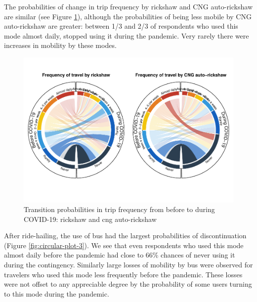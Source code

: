 \documentclass[]{elsarticle} %
\begin{document}
The probabilities of change in trip frequency by rickshaw and CNG
auto-rickshaw are similar (see Figure \ref{fig:circular-plot-2}),
although the probabilities of being less mobile by CNG auto-rickshaw are
greater: between 1/3 and 2/3 of respondents who used this mode almost
daily, stopped using it during the pandemic. Very rarely there were
increases in mobility by these modes.

\begin{figure}
\centering
\includegraphics{Frequency-of-Travel-by-Mode-COVID-19-Bangladesh_files/figure-latex/circular-plots-transition-probabilities-2-1.pdf}
\caption{\label{fig:circular-plot-2}Transition probabilities in trip
frequency from before to during COVID-19: rickshaw and cng
auto-rickshaw}
\end{figure}

After ride-hailing, the use of bus had the largest probabilities of
discontinuation (Figure \ref{fig:circular-plot-3}). We see that even
respondents who used this mode almost daily before the pandemic had
close to 66\% chances of never using it during the contingency.
Similarly large losses of mobility by bus were observed for travelers
who used this mode less frequently before the pandemic. These losses
were not offset to any appreciable degree by the probability of some
users turning to this mode during the pandemic.
\end{document}
